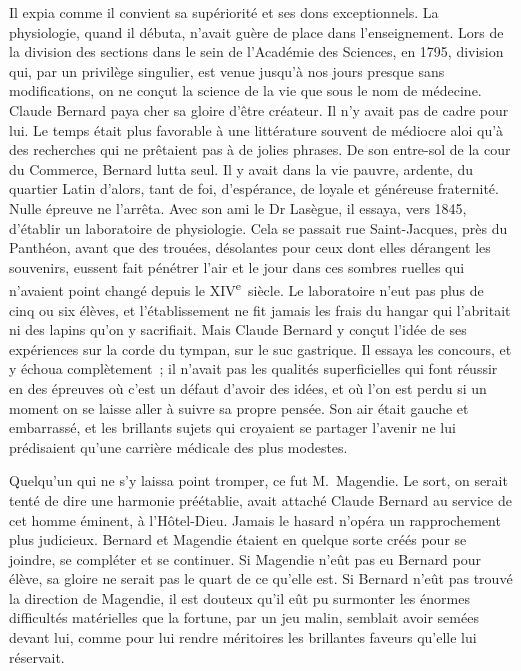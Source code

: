 \documentclass[french,twoside]{book} %
\newcommand\orgName[1]{#1}
\newcommand\persName[1]{#1}
\newcommand\placeName[1]{#1}
\begin{document}
Il expia comme il convient sa supériorité et ses dons exceptionnels. La physiologie, quand il débuta, n’avait guère de place dans l’enseignement. Lors de la division des sections dans le sein de l’{\orgName Académie des Sciences}, en 1795, division qui, par un privilège singulier, est venue jusqu’à nos jours presque sans modifications, on ne conçut la science de la vie que sous le nom de médecine. {\persName Claude Bernard} paya cher sa gloire d’être créateur. Il n’y avait pas de cadre pour lui. Le temps était plus favorable à une littérature souvent de médiocre aloi qu’à des recherches qui ne prêtaient pas à de jolies phrases. De son entre-sol de la {\placeName cour du Commerce}, {\persName Bernard} lutta seul. Il y avait dans la vie pauvre, ardente, du {\placeName quartier Latin} d’alors, tant de foi, d’espérance, de loyale et généreuse fraternité. Nulle épreuve ne l’arrêta. Avec son ami le {\persName Dr Lasègue}, il essaya, vers 1845, d’établir un laboratoire de physiologie. Cela se passait {\placeName rue Saint-Jacques}, près du {\placeName Panthéon}, avant que des trouées, désolantes pour ceux dont elles dérangent les souvenirs, eussent fait pénétrer l’air et le jour dans ces sombres ruelles qui n’avaient point changé depuis le XIV\textsuperscript{e} siècle. Le laboratoire n’eut pas plus de cinq ou six élèves, et l’établissement ne fit jamais les frais du hangar qui l’abritait ni des lapins qu’on y sacrifiait. Mais {\persName Claude Bernard} y conçut l’idée de ses expériences sur la corde du tympan, sur le suc gastrique. Il essaya les concours, et y échoua complètement ; il n’avait pas les qualités superficielles qui font réussir en des épreuves où c’est un défaut d’avoir des idées, et où l’on est perdu si un moment on se laisse aller à suivre sa propre pensée. Son air était gauche et embarrassé, et les brillants sujets qui croyaient se partager l’avenir ne lui prédisaient qu’une carrière médicale des plus modestes.\par
Quelqu’un qui ne s’y laissa point tromper, ce fut {\persName M. Magendie}. Le sort, on serait tenté de dire une harmonie préétablie, avait attaché {\persName Claude Bernard} au service de cet homme éminent, à l’{\orgName Hôtel-Dieu}. Jamais le hasard n’opéra un rapprochement plus judicieux. {\persName Bernard} et {\persName Magendie} étaient en quelque sorte créés pour se joindre, se compléter et se continuer. Si {\persName Magendie} n’eût pas eu {\persName Bernard} pour élève, sa gloire ne serait pas le quart de ce qu’elle est. Si {\persName Bernard} n’eût pas trouvé la direction de {\persName Magendie}, il est douteux qu’il eût pu surmonter les énormes difficultés matérielles que la fortune, par un jeu malin, semblait avoir semées devant lui, comme pour lui rendre méritoires les brillantes faveurs qu’elle lui réservait.\par
\end{document}
